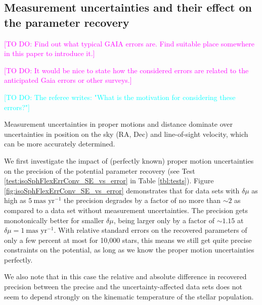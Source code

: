 \documentclass[iop,revtex4]{emulateapj}
\newcommand{\HW}[1]{\textcolor{Cyan}{#1}}
\newcommand{\Wilma}[1]{\textcolor{Magenta}{#1}}
\begin{document}
\subsection{Measurement uncertainties and their effect on the parameter recovery} \label{sec:results_errors}

\Wilma{[TO DO: Find out what typical GAIA errors are. Find suitable place somewhere in this paper to introduce it.]}

\Wilma{[TO DO: It would be nice to state how the considered errors are related to the anticipated Gaia errors or other surveys.]}

\HW{[TO DO: The referee writes: "What is the motivation for considering these errors?"]}

Measurement uncertainties in proper motions and distance dominate over uncertainties in position on the sky (RA, Dec) and line-of-sight velocity, which can be more accurately determined.

We first investigate the impact of (perfectly known) proper motion uncertainties on the precision of the potential parameter recovery (see Test \ref{test:isoSphFlexErrConv_SE_vs_error} in Table \ref{tbl:tests}). Figure \ref{fig:isoSphFlexErrConv_SE_vs_error} demonstrates that for data sets with $\delta \mu$ as high as $5~\text{mas yr}^{-1}$ the precision degrades by  a factor of no more than $\sim2$ as compared to a data set without measurement uncertainties. The precision gets monotonically better for smaller $\delta \mu$, being larger only by a factor of $\sim 1.15$ at $\delta \mu=1~\text{mas yr}^{-1}$. With relative standard errors on the recovered parameters of only a few percent at most for 10,000 stars, this means we still get quite precise constraints on the potential, as long as we know the proper motion uncertainties perfectly.

We also note that in this case the relative and absolute difference in recovered precision between the precise and the uncertainty-affected data sets does not seem to depend strongly on the kinematic temperature of the stellar population.
\end{document}
